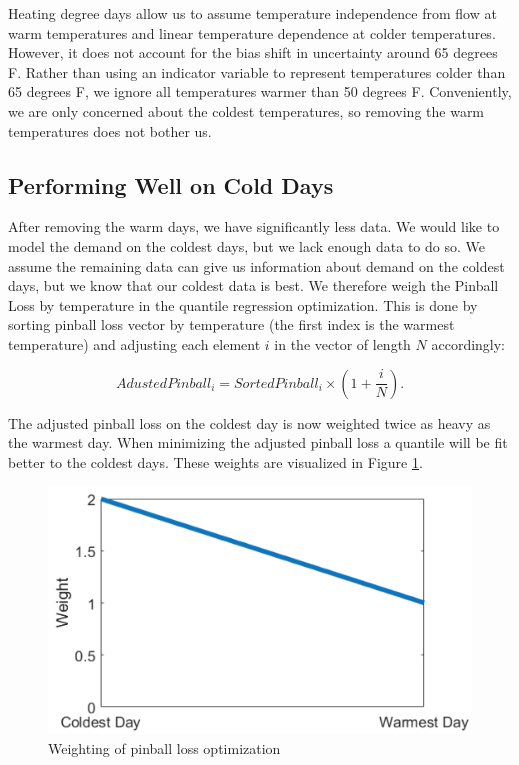 \documentclass{article}
\begin{document}
Heating degree days allow us to assume temperature independence from flow at warm temperatures and linear temperature dependence at colder temperatures. However, it does not account for the bias shift in uncertainty around 65 degrees F. Rather than using an indicator variable to represent temperatures colder than 65 degrees F, we ignore all temperatures warmer than 50 degrees F. Conveniently, we are only concerned about the coldest temperatures, so removing the warm temperatures does not bother us.

\subsection{Performing Well on Cold Days}

After removing the warm days, we have significantly less data. We would like to model the demand on the coldest days, but we lack enough data to do so. We assume the remaining data can give us information about demand on the coldest days, but we know that our coldest data is best. We therefore weigh the Pinball Loss by temperature in the quantile regression optimization. This is done by sorting pinball loss vector by temperature (the first index is the warmest temperature) and adjusting each element $i$ in the vector of length $N$ accordingly:

\begin{equation}
    AdustedPinball_i = SortedPinball_i \times (1 + \frac{i}{N}).
\end{equation}

The adjusted pinball loss on the coldest day is now weighted twice as heavy as the warmest day. When minimizing the adjusted pinball loss a quantile will be fit better to the coldest days. These weights are visualized in Figure \ref{fig:weighting}.

\begin{figure} \label{fig:weighting}
	\centering
	\includegraphics[scale=0.4]{weighting.png}
	\caption{Weighting of pinball loss optimization}
\end{figure}
\end{document}

